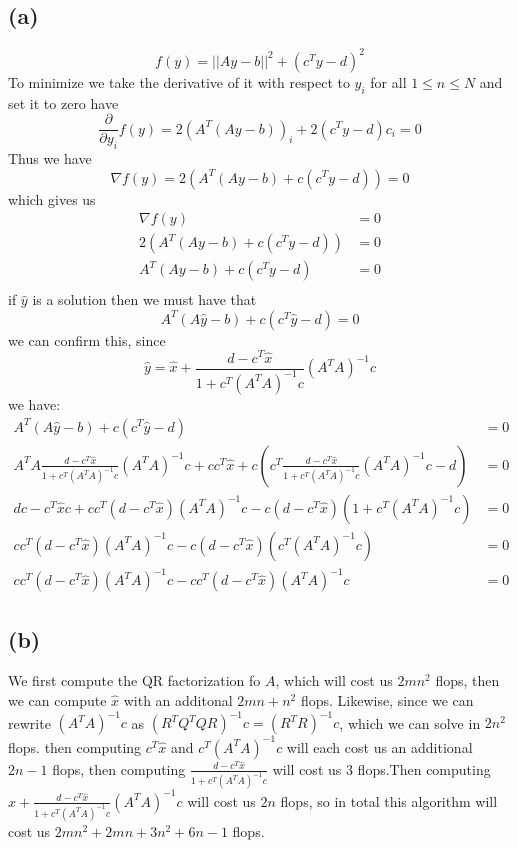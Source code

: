 \subsection*{(a)}
$$f(y)=||Ay-b||^2+(c^Ty-d)^2$$
To minimize we take the derivative of it with respect to $y_i$ for all
$1\leq n \leq N$ and set it to zero have
$$\frac{\partial}{\partial y_i} f(y)=2(A^T(Ay-b))_i+2(c^Ty-d)c_i=0$$
Thus we have 
$$\nabla f(y)=2(A^T(Ay-b)+c(c^Ty-d))=0$$
which gives us
\begin{align*}
    \nabla f(y)&=0\\
    2(A^T(Ay-b)+c(c^Ty-d))&=0\\
    A^T(Ay-b)+c(c^Ty-d)&=0\\
\end{align*}
if $\hat{y}$ is a solution then we must have that
$$A^T(A\hat{y}-b)+c(c^T\hat{y}-d)=0$$
we can confirm this, since 
$$\hat{y}=\hat{x}+\frac{d-c^T\hat{x}}{1+c^T(A^TA)^{-1}c}(A^TA)^{-1}c$$
we have:
\begin{align*}
    A^T(A\hat{y}-b)+c(c^T\hat{y}-d)&=0\\
    A^TA\frac{d-c^T\hat{x}}{1+c^T(A^TA)^{-1}c}(A^TA)^{-1}c+cc^T\hat{x}+c(c^T\frac{d-c^T\hat{x}}{1+c^T(A^TA)^{-1}c}(A^TA)^{-1}c-d)&=0\\
    dc-c^T\hat{x}c+cc^T(d-c^T\hat{x})(A^TA)^{-1}c-c(d-c^T\hat{x})(1+c^T(A^TA)^{-1}c)&=0\\
    cc^T(d-c^T\hat{x})(A^TA)^{-1}c-c(d-c^T\hat{x})(c^T(A^TA)^{-1}c)&=0\\
    cc^T(d-c^T\hat{x})(A^TA)^{-1}c-cc^T(d-c^T\hat{x})(A^TA)^{-1}c&=0
\end{align*}
\subsection*{(b)}
We first compute the QR factorization fo $A$, which will cost us $2mn^2$ flops, 
then we can compute 
$\hat{x}$ with an additonal $2mn+n^2$ flops. Likewise,
since we can rewrite $(A^TA)^{-1}c$ as $(R^TQ^TQR)^{-1}c=(R^TR)^{-1}c$, which 
we can solve in $2n^2$ flops. then computing $c^T\hat{x}$ and $c^T(A^TA)^{-1}c$ will
each cost us an additional $2n-1$ flops, then computing $\frac{d-c^T\hat{x}}{1+c^T(A^TA)^{-1}c}$ will 
cost us 3 flops.Then computing $\hat{x}+\frac{d-c^T\hat{x}}{1+c^T(A^TA)^{-1}c}(A^TA)^{-1}c$
will cost us $2n$ flops, so in total this algorithm will cost us 
$\boxed{2mn^2+2mn+3n^2+6n-1}$ flops.






